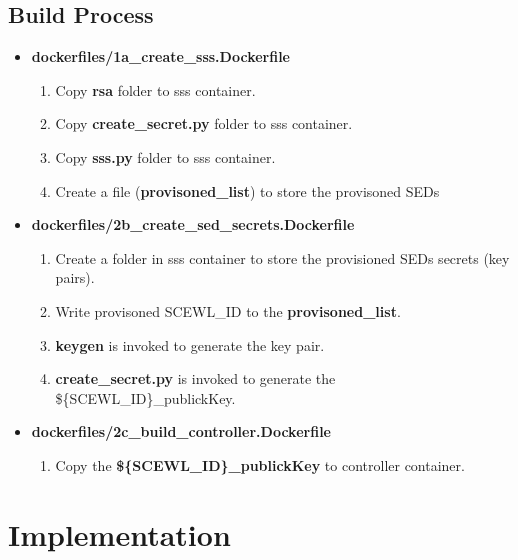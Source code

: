 \documentclass[11pt,oneside,onecolumn,letterpaper]{article}
\begin{document}
\subsection{Build Process}

  \begin{itemize}
    \item \textbf{dockerfiles/1a\_create\_sss.Dockerfile}
    \begin{enumerate}
      \item Copy \textbf{rsa} folder to sss container.
      \item Copy \textbf{create\_secret.py} folder to sss container.
      \item Copy \textbf{sss.py} folder to sss container.
      \item Create a file (\textbf{provisoned\_list}) to store the provisoned SEDs
    \end{enumerate}
    \item \textbf{dockerfiles/2b\_create\_sed\_secrets.Dockerfile}
    \begin{enumerate}
      \item Create a folder in sss container to store the provisioned SEDs secrets (key pairs).
      \item Write provisoned SCEWL\_ID to the \textbf{provisoned\_list}.
      \item \textbf{keygen} is invoked to generate the key pair.
      \item \textbf{create\_secret.py} is invoked to generate the \$\{SCEWL\_ID\}\_publickKey.
    \end{enumerate}
    \item \textbf{dockerfiles/2c\_build\_controller.Dockerfile}
    \begin{enumerate}
      \item Copy the \textbf{\$\{SCEWL\_ID\}\_publickKey} to controller container.
    \end{enumerate}
  \end{itemize}

\section{Implementation}
\end{document}
